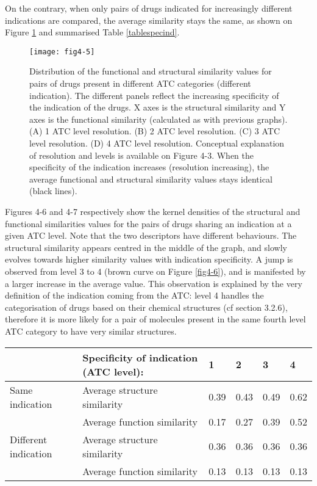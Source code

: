 On the contrary, when only pairs of drugs indicated for increasingly different indications are compared, the average similarity stays the same, as shown on Figure \ref{fig4-5} and summarised Table \ref{tablespecind}.

\begin{figure}[ht]
    \centering
    \texttt{[image: fig4-5]}
    \caption{Distribution of the functional and structural similarity values for pairs of drugs present in different ATC categories (different indication). The different panels reflect the increasing specificity of the indication of the drugs. X axes is the structural similarity and Y axes is the functional similarity (calculated as with previous graphs). (A) 1 ATC level resolution. (B) 2 ATC level resolution. (C) 3 ATC level resolution. (D) 4 ATC level resolution. Conceptual explanation of resolution and levels is available on Figure 4-3. When the specificity of the indication increases (resolution increasing), the average functional and structural similarity values stays identical (black lines).}
    \label{fig4-5}
\end{figure}

Figures 4-6 and 4-7 respectively show the kernel densities of the structural and functional similarities values for the pairs of drugs sharing an indication at a given ATC level. Note that the two descriptors have different behaviours. The structural similarity appears centred in the middle of the graph, and slowly evolves towards higher similarity values with indication specificity. A jump is observed from level 3 to 4 (brown curve on Figure \ref{fig4-6}), and is manifested by a larger increase in the average value. This observation is explained by the very definition of the indication coming from the ATC: level 4 handles the categorisation of drugs based on their chemical structures (cf section 3.2.6), therefore it is more likely for a pair of molecules present in the same fourth level ATC category to have very similar structures.

\begin{center}
\small
    \begin{tabular}{| l | l | l | l | l | l |}
    \hline
 & Specificity of indication (ATC level): & 1 & 2 & 3 & 4 \\ \hline \hline
Same indication & Average structure similarity & 0.39 & 0.43 & 0.49 & 0.62 \\ 
 & Average function similarity & 0.17 & 0.27 & 0.39 & 0.52 \\ \hline
Different indication & Average structure similarity & 0.36 & 0.36 & 0.36 & 0.36 \\
 & Average function similarity & 0.13 & 0.13 & 0.13 & 0.13 \\ \hline
    \end{tabular} 
    \label{tablespecind}
\end{center}

